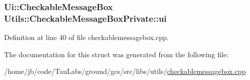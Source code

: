 \hypertarget{struct_utils_1_1_checkable_message_box_private_a7775c12cc49befaa49faec030c670e1b}{
\subsubsection[{ui}]{\setlength{\rightskip}{0pt plus 5cm}\-Ui\-::\-Checkable\-Message\-Box {\bf \-Utils\-::\-Checkable\-Message\-Box\-Private\-::ui}}}\label{struct_utils_1_1_checkable_message_box_private_a7775c12cc49befaa49faec030c670e1b}


\-Definition at line 40 of file checkablemessagebox.\-cpp.



\-The documentation for this struct was generated from the following file\-:\begin{DoxyCompactItemize}
\item 
/home/jb/code/\-Tau\-Labs/ground/gcs/src/libs/utils/\hyperlink{checkablemessagebox_8cpp}{checkablemessagebox.\-cpp}\end{DoxyCompactItemize}
